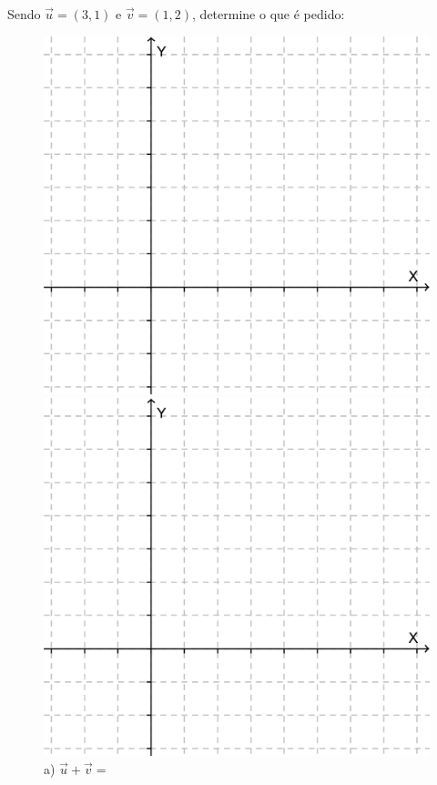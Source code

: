 \begin{exemplo} Sendo $\vec{u}=(3, 1)$ e $\vec{v}=(1, 2)$, determine o que é pedido:

\begin{figure}[H]
\begin{minipage}[b]{0.3\linewidth}
\includegraphics[width=\linewidth]{analitica/imagens/malha.png}
\caption{a) $\vec{u}+\vec{v}=$}
\end{minipage} \hfill
\begin{minipage}[b]{0.3\linewidth}
\includegraphics[width=\linewidth]{analitica/imagens/malha.png}

\end{minipage}
\end{figure}
\end{exemplo}
